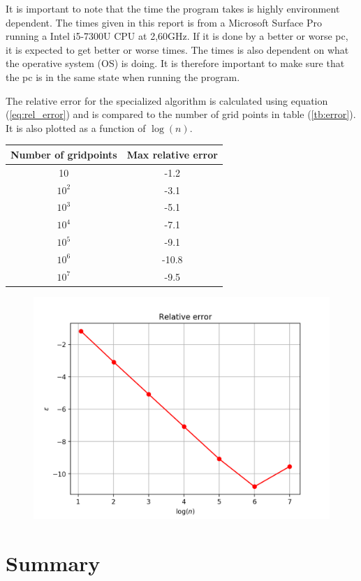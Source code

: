 \documentclass[10pt]{article}
\begin{document}
It is important to note that the time the program takes is highly environment dependent. The times given in this report is from a Microsoft Surface Pro running a Intel i5-7300U CPU at 2,60GHz. If it is done by a better or worse pc, it is expected to get better or worse times. The times is also dependent on what the operative system (OS) is doing. It is therefore important to make sure that the pc is in the same state when running the program.

\break

The relative error for the specialized algorithm is calculated using equation (\ref{eq:rel_error}) and is compared to the number of grid points in table (\ref{tb:error}). It is also plotted as a function of $\log{(n)}$.


\begin{center}
  \label{tb:error}
  \begin{tabular}{||c|c||}

    \hline\hline Number of gridpoints & Max relative error \\
    \hline
    10 & -1.2 \\
    \hline
    $10^2$ & -3.1 \\
    \hline
    $10^3$ & -5.1 \\ 
    \hline
    $10^4$ & -7.1 \\
    \hline
    $10^5$ & -9.1 \\ 
    \hline
    $10^6$ & -10.8\\
    \hline
    $10^7$ & -9.5\\
    \hline\hline
    
  \end{tabular}
\end{center}

\begin{figure}[H]
  \centering  
  \includegraphics[scale=0.5]{relative_error.png}
\end{figure}

\section{Summary}

\printbibliography
\end{document}
